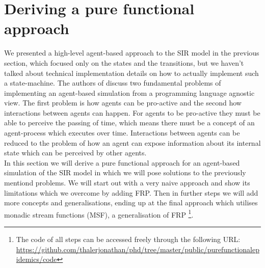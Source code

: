 \section{Deriving a pure functional approach}

We presented a high-level agent-based approach to the SIR model in the previous section, which focused only on the states and the transitions, but we haven't talked about technical implementation details on how to actually implement such a state-machine. The authors of \cite{thaler_art_2017} discuss two fundamental problems of implementing an agent-based simulation from a programming language agnostic view. The first problem is how agents can be pro-active and the second how interactions between agents can happen. For agents to be pro-active they must be able to perceive the passing of time, which means there must be a concept of an agent-process which executes over time. Interactions between agents can be reduced to the problem of how an agent can expose information about its internal state which can be perceived by other agents. \\
In this section we will derive a pure functional approach for an agent-based simulation of the SIR model in which we will pose solutions to the previously mentiond problems. We will start out with a very naive approach and show its limitations which we overcome by adding FRP. Then in further steps we will add more concepts and generalisations, ending up at the final approach which utilises monadic stream functions (MSF), a generalisation of FRP 
\footnote{The code of all steps can be accessed freely through the following URL: \url{https://github.com/thalerjonathan/phd/tree/master/public/purefunctionalepidemics/code}}.











%